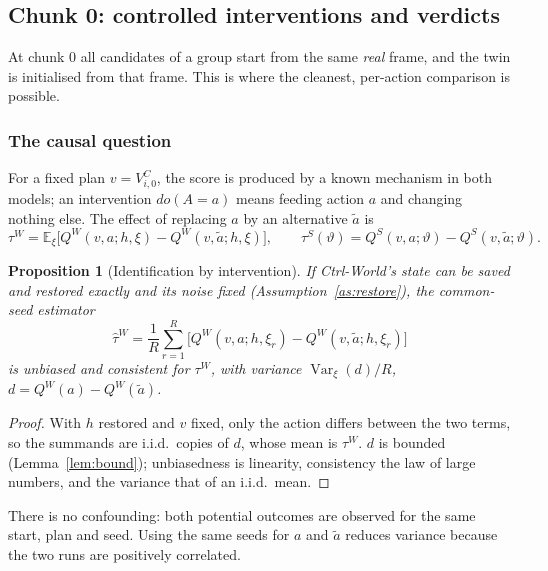\documentclass[11pt,a4paper]{article}
\theoremstyle{plain}
\newtheorem{proposition}{Proposition}
\theoremstyle{definition}
\theoremstyle{remark}
\newcommand{\VC}{V^{C}}
\newcommand{\E}{\mathbb E}
\DeclareMathOperator{\Var}{Var}
\begin{document}
\subsection{Chunk 0: controlled interventions and verdicts}\label{sec:chunk0}
At chunk 0 all candidates of a group start from the same \emph{real} frame, and the twin is initialised from that frame. This is where the cleanest, per-action comparison is possible.

\subsubsection{The causal question}
For a fixed plan $v=\VC_{i,0}$, the score is produced by a known mechanism in both models; an intervention $do(A=a)$ means feeding action $a$ and changing nothing else. The effect of replacing $a$ by an alternative $\tilde a$ is
\begin{equation}\label{eq:tau}
\tau^W=\E_{\xi}\big[Q^W(v,a;h,\xi)-Q^W(v,\tilde a;h,\xi)\big],\qquad
\tau^S(\vartheta)=Q^S(v,a;\vartheta)-Q^S(v,\tilde a;\vartheta).
\end{equation}
\begin{proposition}[Identification by intervention]\label{prop:ident}
If Ctrl-World's state can be saved and restored exactly and its noise fixed (Assumption~\ref{as:restore}), the common-seed estimator
\[\hat\tau^W=\frac1R\sum_{r=1}^{R}\big[Q^W(v,a;h,\xi_r)-Q^W(v,\tilde a;h,\xi_r)\big]\]
is unbiased and consistent for $\tau^W$, with variance $\Var_\xi(d)/R$, $d=Q^W(a)-Q^W(\tilde a)$.
\end{proposition}
\begin{proof}
With $h$ restored and $v$ fixed, only the action differs between the two terms, so the summands are i.i.d.\ copies of $d$, whose mean is $\tau^W$. $d$ is bounded (Lemma~\ref{lem:bound}); unbiasedness is linearity, consistency the law of large numbers, and the variance that of an i.i.d.\ mean.
\end{proof}
There is no confounding: both potential outcomes are observed for the same start, plan and seed. Using the same seeds for $a$ and $\tilde a$ reduces variance because the two runs are positively correlated.
\end{document}
